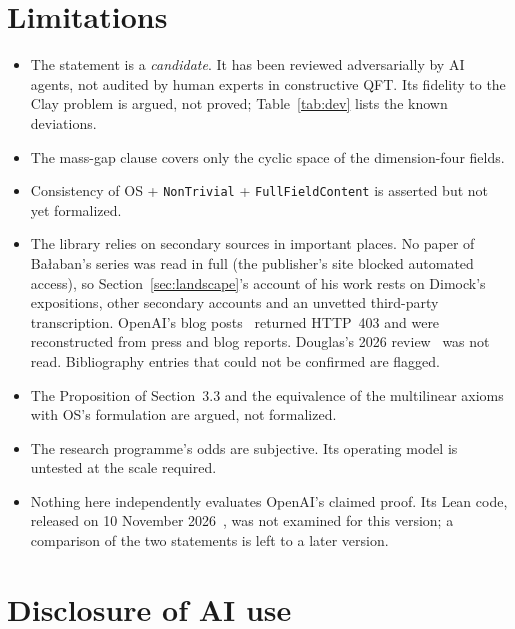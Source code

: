 \documentclass[11pt]{article}
\theoremstyle{definition}
\theoremstyle{remark}
\newcommand{\lean}[1]{\texttt{\hyphenchar\font=-1\relax #1}}
\begin{document}
\section{Limitations}
\begin{itemize}[leftmargin=*]
\item The statement is a \emph{candidate}. It has been reviewed adversarially by AI agents, not
  audited by human experts in constructive QFT. Its fidelity to the Clay problem is argued, not
  proved; Table~\ref{tab:dev} lists the known deviations.
\item The mass-gap clause covers only the cyclic space of the dimension-four fields.
\item Consistency of OS + \lean{NonTrivial} + \lean{FullFieldContent} is asserted but not yet
  formalized.
\item The library relies on secondary sources in important places. No paper of Ba{\l}aban's series
  was read in full (the publisher's site blocked automated access), so
  Section~\ref{sec:landscape}'s account of his work rests on Dimock's expositions, other secondary
  accounts and an unvetted third-party transcription. OpenAI's blog posts~\cite{OpenAI2026g,OpenAI2026p}
  returned HTTP~403 and were reconstructed from press and blog reports. Douglas's 2026
  review~\cite{Douglas2026f} was not read. Bibliography entries that could not be confirmed are
  flagged.
\item The Proposition of Section~3.3 and the equivalence of the multilinear axioms with OS's
  formulation are argued, not formalized.
\item The research programme's odds are subjective. Its operating model is untested at the
  scale required.
\item Nothing here independently evaluates OpenAI's claimed proof. Its Lean code, released on
  10 November 2026~\cite{Douglas2026g}, was not examined for this version; a comparison of the two
  statements is left to a later version.
\end{itemize}

\section{Disclosure of AI use}\label{sec:ai}
\end{document}
